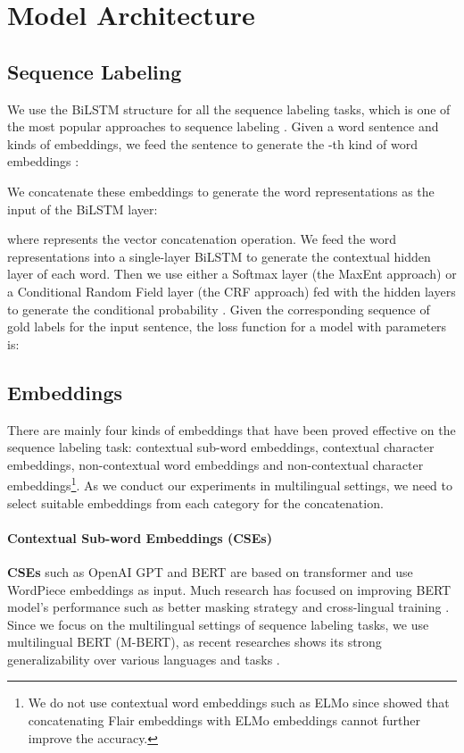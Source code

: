 \documentclass[11pt,a4paper]{article}
\begin{document}
\section{Model Architecture}
\subsection{Sequence Labeling}
We use the BiLSTM structure for all the sequence labeling tasks, which is one of the most popular approaches to sequence labeling \cite{huang2015bidirectional,ma-hovy-2016-end}. Given a  word sentence  and  kinds of embeddings, we feed the sentence to generate the -th kind of word embeddings :

We concatenate these embeddings to generate the word representations  as the input of the BiLSTM layer:

where  represents the vector concatenation operation. We feed the word representations into a single-layer BiLSTM to generate the contextual hidden layer of each word. Then we use either a Softmax layer (the MaxEnt approach) or a Conditional Random Field layer (the CRF approach) \cite{10.5555/645530.655813,lample-etal-2016-neural,ma-hovy-2016-end} fed with the hidden layers to generate the conditional probability . Given the corresponding sequence of gold labels  for the input sentence, the loss function for a model with parameters  is:


\subsection{Embeddings}
There are mainly four kinds of embeddings that have been proved effective on the sequence labeling task: contextual sub-word embeddings, contextual character embeddings, non-contextual word embeddings and non-contextual character embeddings\footnote{We do not use contextual word embeddings such as ELMo \cite{peters-etal-2018-deep} since \citet{akbik-etal-2018-contextual} showed that concatenating Flair embeddings with ELMo embeddings cannot further improve the accuracy.}.
As we conduct our experiments in multilingual settings, we need to select suitable embeddings from each category for the concatenation. 

\paragraph{Contextual Sub-word Embeddings (CSEs)} 
\textbf{CSEs} such as OpenAI GPT \cite{radford2018improving} and BERT \cite{devlin-etal-2019-bert} are based on transformer \cite{vaswani2017attention} and use WordPiece embeddings \cite{sennrich-etal-2016-neural,wu2016google} as input.
Much research has focused on improving BERT model's performance such as better masking strategy \cite{liu2019roberta} and cross-lingual training \cite{conneau2019cross}. 
Since we focus on the multilingual settings of sequence labeling tasks, we use multilingual BERT (M-BERT), as recent researches shows its strong generalizability over various languages and tasks \cite{pires-etal-2019-multilingual,karthikeyan2020cross}.
\end{document}
